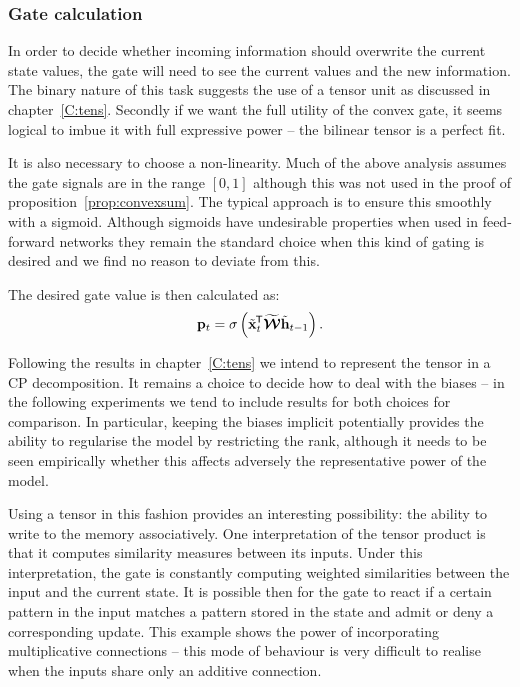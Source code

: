 \subsubsection{Gate calculation}
In order to decide whether incoming information should
overwrite the current state values, the gate will need to see the current values and the new information.
 The binary nature of this task suggests
the use of a tensor unit as discussed in chapter~\ref{C:tens}. Secondly if we want the full utility of
the convex gate, it seems logical to imbue it with full expressive power -- the bilinear tensor is a
perfect fit.

It is also necessary to choose a non-linearity. Much of the above analysis assumes the gate signals are
in the range \([0, 1]\) although this was not used in the proof of proposition~\ref{prop:convexsum}. The
typical approach is to ensure this smoothly with a sigmoid. Although sigmoids have undesirable
properties when used in feed-forward networks \autocite{Glorot2010} they remain the standard choice
when this kind of gating is desired \autocite{VandenOord2016, Oord2016} and we find no reason to
deviate from this.

The desired gate value is then calculated as:
\begin{equation}\label{eq:propgatevalue}
	\mathbf{p}_t = \sigma\left(\tilde{\mathbf{x}}^{\mkern-1.5mu\mathsf{T}}_t\widetilde{\bm{\mathcal{W}}}\tilde{\mathbf{h}}_{t-1} \right).
\end{equation}

Following the results in chapter~\ref{C:tens} we intend to represent the tensor in a CP decomposition.
It remains a choice to decide how to deal with the biases -- in the following experiments we tend to
include results for both choices for comparison. In particular, keeping the biases implicit potentially
provides the ability to regularise the model by restricting the rank, although it needs to be seen
empirically whether this affects adversely the representative power of the model.

Using a tensor in this fashion provides an interesting possibility: the ability to write to the memory
associatively. One interpretation of the tensor product is that it computes similarity measures between
its inputs. Under this interpretation, the gate is constantly computing weighted similarities between
the input and the current state. It is possible then for the gate to react if a certain pattern in the
input matches a pattern stored in the state and admit or deny a corresponding update. This example
shows the power of incorporating multiplicative connections -- this mode of behaviour is very difficult
to realise when the inputs share only an additive connection.


